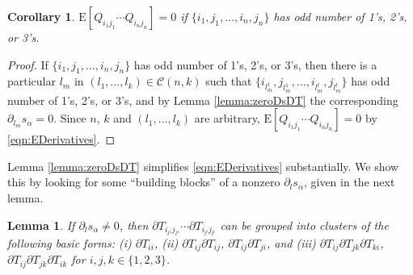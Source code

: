 \documentclass[10pt]{article}
\newtheorem{corollary}{Corollary}
\newtheorem{lemma}{Lemma}
\newcommand{\expect}[1]{\ensuremath{\mathrm{E}\left[ #1 \right]}}
\begin{document}
\begin{corollary}
	$\expect{Q_{i_1j_1} \cdots Q_{i_nj_n}} = 0$ if $\{i_1,j_1,\ldots,i_n,j_n\}$ has odd number of 1's, 2's, or 3's.
\end{corollary}
\begin{proof}
	If $\{i_1,j_1,\ldots,i_n,j_n\}$ has odd number of 1's, 2's, or 3's, then there is a particular $l_m$ in $(l_1,\ldots,l_k) \in \mathcal{C}(n,k)$ such that $\{i_{l_m^1},j_{l_m^1},\ldots,i_{l_m^t},j_{l_m^t}\}$ has odd number of 1's, 2's, or 3's, and by Lemma \ref{lemma:zeroDsDT} the corresponding $\partial_{l_m} s_\alpha = 0$.
	Since $n$, $k$ and $(l_1,\ldots,l_k)$ are arbitrary, $\expect{Q_{i_1j_1} \cdots Q_{i_nj_n}} = 0$ by \eqref{eqn:EDerivatives}.
\end{proof}

Lemma \ref{lemma:zeroDsDT} simplifies \eqref{eqn:EDerivatives} substantially.
We show this by looking for some ``building blocks'' of a nonzero $\partial_l s_\alpha$, given in the next lemma.
\begin{lemma} \label{lemma:basicForms}
	If $\partial_l s_\alpha \neq 0$, then $\partial T_{i_{l^1}j_{l^1}} \cdots \partial T_{i_{l^t}j_{l^t}}$ can be grouped into clusters of the following basic forms: (i) $\partial T_{ii}$, (ii) $\partial T_{ij} \partial T_{ij}$, $\partial T_{ij} \partial T_{ji}$, and (iii) $\partial T_{ij} \partial T_{jk} \partial T_{ki}$,  $\partial T_{ij} \partial T_{jk} \partial T_{ik}$ for $i,j,k\in\{1,2,3\}$.
\end{lemma}
\end{document}
